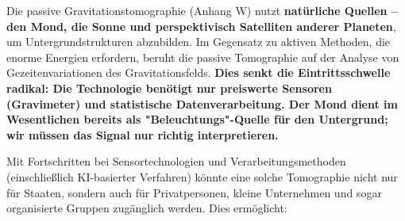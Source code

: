 \documentclass[12pt,a4paper]{article}
\theoremstyle{remark}
\begin{document}
	Die passive Gravitationstomographie (Anhang W) nutzt \textbf{natürliche Quellen – den Mond, die Sonne und perspektivisch Satelliten anderer Planeten}, um Untergrundstrukturen abzubilden. Im Gegensatz zu aktiven Methoden, die enorme Energien erfordern, beruht die passive Tomographie auf der Analyse von Gezeitenvariationen des Gravitationsfelds. \textbf{Dies senkt die Eintrittsschwelle radikal: Die Technologie benötigt nur preiswerte Sensoren (Gravimeter) und statistische Datenverarbeitung. Der Mond dient im Wesentlichen bereits als "Beleuchtungs"-Quelle für den Untergrund; wir müssen das Signal nur richtig interpretieren.}
	
	Mit Fortschritten bei Sensortechnologien und Verarbeitungsmethoden (einschließlich KI-basierter Verfahren) könnte eine solche Tomographie nicht nur für Staaten, sondern auch für Privatpersonen, kleine Unternehmen und sogar organisierte Gruppen zugänglich werden. Dies ermöglicht:
\end{document}
